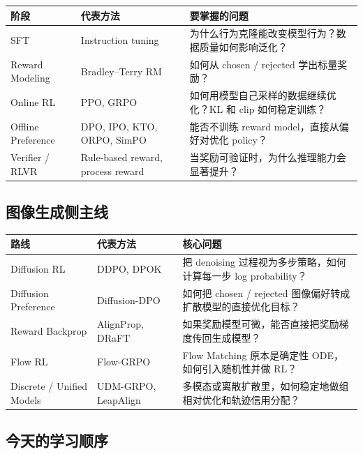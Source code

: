 \begin{center}
{\small
\begin{tabular}{p{2.6cm}p{4.2cm}p{6.2cm}}
\hline
\textbf{阶段} & \textbf{代表方法} & \textbf{要掌握的问题} \\
\hline
SFT & Instruction tuning & 为什么行为克隆能改变模型行为？数据质量如何影响泛化？ \\
Reward Modeling & Bradley--Terry RM & 如何从 chosen / rejected 学出标量奖励？ \\
Online RL & PPO, GRPO & 如何用模型自己采样的数据继续优化？KL 和 clip 如何稳定训练？ \\
Offline Preference & DPO, IPO, KTO, ORPO, SimPO & 能否不训练 reward model，直接从偏好对优化 policy？ \\
Verifier / RLVR & Rule-based reward, process reward & 当奖励可验证时，为什么推理能力会显著提升？ \\
\hline
\end{tabular}
}
\end{center}

\subsection{图像生成侧主线}

\begin{center}
{\small
\begin{tabular}{p{3cm}p{4.2cm}p{5.8cm}}
\hline
\textbf{路线} & \textbf{代表方法} & \textbf{核心问题} \\
\hline
Diffusion RL & DDPO, DPOK & 把 denoising 过程视为多步策略，如何计算每一步 log probability？ \\
Diffusion Preference & Diffusion-DPO & 如何把 chosen / rejected 图像偏好转成扩散模型的直接优化目标？ \\
Reward Backprop & AlignProp, DRaFT & 如果奖励模型可微，能否直接把奖励梯度传回生成模型？ \\
Flow RL & Flow-GRPO & Flow Matching 原本是确定性 ODE，如何引入随机性并做 RL？ \\
Discrete / Unified Models & UDM-GRPO, LeapAlign & 多模态或离散扩散里，如何稳定地做组相对优化和轨迹信用分配？ \\
\hline
\end{tabular}
}
\end{center}

\subsection{今天的学习顺序}

